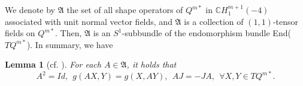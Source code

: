 \documentclass[reqno]{amsart}%
\newtheorem{lemma}[theorem]{Lemma}
\theoremstyle{definition}
\numberwithin{equation}{section}
\begin{document}
We denote by $\mathfrak{A}$ the set of all shape operators of $Q^{m*}$ in $\mathbb{C}H^{m+1}_1(-4)$  associated with unit normal vector fields, and $\mathfrak{A}$ is a collection of $(1,1)$-tensor fields on $Q^{m*}$.
Then, $\mathfrak{A}$ is an $S^1$-subbundle of the endomorphism
bundle End($TQ^{m*}$). In summary, we have

%
%

\begin{lemma}[cf. \cite{BS-2022,K-S,M-R,V-W}]\label{lemma:2.1}
For each $A\in\mathfrak{A}$, it holds that
%
\begin{equation}\label{eqn:2.1}
A^2=Id, \ \ g(AX,Y)=g(X,AY), \ \ AJ=-JA, \ \ \forall X,Y\in TQ^{m*}.
\end{equation}
\end{lemma}
\end{document}
